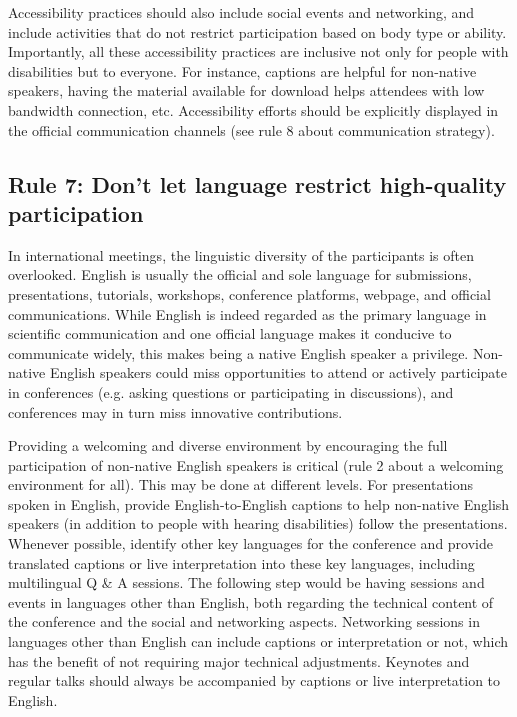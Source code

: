 \documentclass[10pt,letterpaper]{article}
\begin{document}
Accessibility practices should also include social events and networking, and include activities that do not restrict participation based on body type or ability. Importantly, all these accessibility practices are inclusive not only for people with disabilities but to everyone.
For instance, captions are helpful for non-native speakers, having the material available for download helps attendees with low bandwidth connection, etc. Accessibility efforts should be explicitly displayed in the official communication channels (see rule 8 about communication strategy). 



\subsection*{Rule 7: Don't let language restrict high-quality participation}
\label{rule_language}

In international meetings, the linguistic diversity of the participants is often overlooked. 
English is usually the official and sole language for submissions, presentations, tutorials, workshops, conference platforms, webpage, and official communications. 
While English is indeed regarded as the primary language in scientific communication and one official language makes it conducive to communicate widely, this makes being a native English speaker a privilege.
Non-native English speakers could miss opportunities to attend or actively participate in conferences (e.g. asking questions or participating in discussions),
and conferences may in turn miss innovative contributions.


Providing a welcoming and diverse environment by encouraging the full participation of non-native English speakers is critical (rule 2 about a welcoming environment for all). This may be done at different levels. 
For presentations spoken in English, provide English-to-English captions to help non-native English speakers (in addition to people with hearing disabilities) follow the presentations. Whenever possible, identify other key languages for the conference and provide translated captions or live interpretation into these key languages, including multilingual Q \& A sessions.
The following step would be having sessions and events in languages other than English, both regarding the technical content of the conference and the social and networking aspects. Networking sessions in languages other than English can include captions or interpretation or not, which has the benefit of not requiring major technical adjustments. Keynotes and regular talks should always be accompanied by captions or live interpretation to English.
\end{document}
